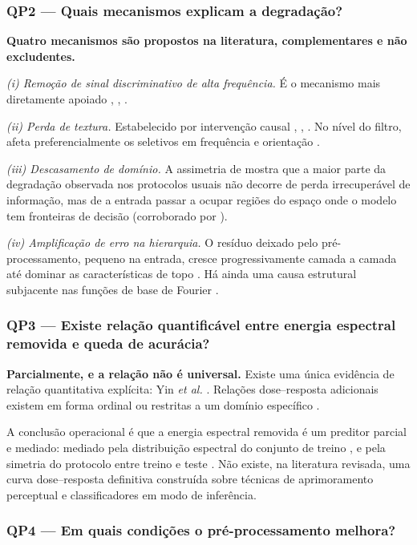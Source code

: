 \documentclass[conference]{IEEEtran}
\begin{document}
\subsubsection{QP2 --- Quais mecanismos explicam a degradação?}

\textbf{Quatro mecanismos são propostos na literatura, complementares e não
excludentes.}

\emph{(i) Remoção de sinal discriminativo de alta frequência.} É o mecanismo
mais diretamente apoiado \cite{b14}, \cite{b15}, \cite{b17}.

\emph{(ii) Perda de textura.} Estabelecido por intervenção causal \cite{b16}, \cite{b1}, \cite{b2}. No nível do filtro, afeta preferencialmente os seletivos em frequência e orientação \cite{b25}.

\emph{(iii) Descasamento de domínio.} A
assimetria de \cite{b23} mostra que a maior parte
da degradação observada nos protocolos usuais não decorre de perda
irrecuperável de informação, mas de a entrada passar a ocupar regiões do espaço
onde o modelo tem fronteiras de decisão (corroborado por \cite{b4}).

\emph{(iv) Amplificação de erro na hierarquia.} O resíduo deixado pelo
pré-processamento, pequeno na entrada, cresce progressivamente camada a camada
até dominar as características de topo \cite{b7}. Há ainda uma
causa estrutural subjacente nas funções de base de Fourier \cite{b19}.

\subsubsection{QP3 --- Existe relação quantificável entre energia espectral
removida e queda de acurácia?}

\textbf{Parcialmente, e a relação não é universal.} Existe uma única evidência
de relação quantitativa explícita: Yin \textit{et al.} \cite{b18}. Relações
dose--resposta adicionais existem em forma ordinal \cite{b20} ou restritas a um domínio específico \cite{b21}.

A conclusão operacional é que a energia espectral removida é um preditor
parcial e mediado: mediado pela distribuição espectral do conjunto de treino
\cite{b16}, \cite{b22} e pela simetria do protocolo entre treino e teste
\cite{b23}. Não existe, na literatura revisada, uma curva dose--resposta definitiva construída sobre
técnicas de aprimoramento perceptual e classificadores em modo de inferência.

\subsubsection{QP4 --- Em quais condições o pré-processamento melhora?}
\end{document}
